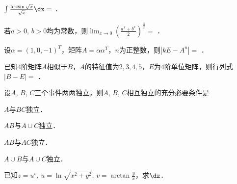 \documentclass[plain,noanswer,medmath]{../../template/jnuexam}
\begin{document}






\begin{problem}
$\int \frac{\arcsin \sqrt{x}}{\sqrt{x}} \dx =$ \fillin{}．
\end{problem}


\begin{problem}
若$a > 0$, $b > 0$均为常数，则$\lim_{x \to 0} \left(\frac{a^x + b^x}{2} \right)^{\frac{3}{x}} =$ \fillin{}．
\end{problem}


\begin{problem}
设$\alpha = (1,0, - 1)^T$，矩阵$A = \alpha \alpha^T$，$n$为正整数，则$|kE - A^n| =$ \fillin{}．
\end{problem}


\begin{problem}
已知$4$阶矩阵$A$相似于$B$，$A$的特征值为$2,3,4,5$，$E$为$4$阶单位矩阵，则行列式$|B - E| =$ \fillin{}．
\end{problem}












\begin{problem}
设$A$, $B$, $C$三个事件两两独立，则$A$, $B$, $C$相互独立的充分必要条件是\pickout{}
\begin{abcd}
\item $A$与$BC$独立．
\item $AB$与$A \cup C$独立．
\item $AB$与$AC$独立．
\item $A \cup B$与$A \cup C$独立．
\end{abcd}
\end{problem}





\begin{problem}
已知$z = u^v$, $u = \ln \sqrt{x^2 + y^2}$, $v = \arctan \frac{y}{x}$，求$\dz$．
\end{problem}
\end{document}

